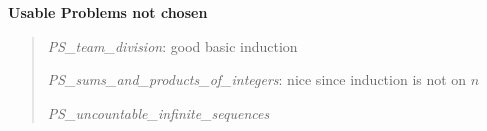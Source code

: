 \documentclass[handout]{mcs}
\begin{document}
\renewcommand{\reading}{Chapter~\bref{induction_chap},
  \emph{Induction}; Chapter~\bref{partial-order-chapter},
  \emph{Partial Orders}, \S\S 1--3.}



\begin{staffnotes}

\begin{center}
\textbf{Usable Problems not chosen}
\end{center}

\begin{quote}
\emph{PS_team_division}: good basic induction

\emph{PS_sums_and_products_of_integers}: nice since induction is not
on $n$

\emph{PS_uncountable_infinite_sequences}

\end{quote}
\end{staffnotes}





\end{document}
